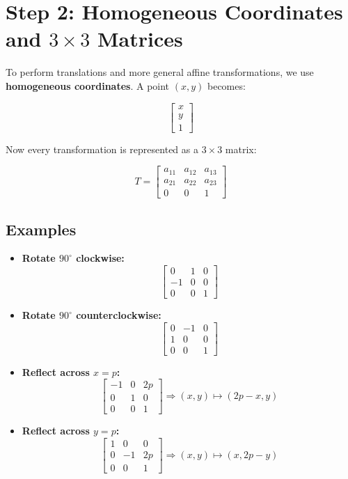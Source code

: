 \documentclass[12pt]{article}
\begin{document}
\section*{Step 2: Homogeneous Coordinates and $3 \times 3$ Matrices}
To perform translations and more general affine transformations, we use \textbf{homogeneous coordinates}. A point $(x, y)$ becomes:

\[
\begin{bmatrix}
x \\
y \\
1
\end{bmatrix}
\]

Now every transformation is represented as a $3 \times 3$ matrix:

\[
T =
\begin{bmatrix}
a_{11} & a_{12} & a_{13} \\
a_{21} & a_{22} & a_{23} \\
0 & 0 & 1
\end{bmatrix}
\]

\subsection*{Examples}
\begin{itemize}
    \item \textbf{Rotate $90^\circ$ clockwise:}
    \[
    \begin{bmatrix}
    0 & 1 & 0 \\
    -1 & 0 & 0 \\
    0 & 0 & 1
    \end{bmatrix}
    \]

    \item \textbf{Rotate $90^\circ$ counterclockwise:}
    \[
    \begin{bmatrix}
    0 & -1 & 0 \\
    1 & 0 & 0 \\
    0 & 0 & 1
    \end{bmatrix}
    \]

    \item \textbf{Reflect across $x = p$:}
    \[
    \begin{bmatrix}
    -1 & 0 & 2p \\
    0 & 1 & 0 \\
    0 & 0 & 1
    \end{bmatrix}
    \Rightarrow (x, y) \mapsto (2p - x, y)
    \]

    \item \textbf{Reflect across $y = p$:}
    \[
    \begin{bmatrix}
    1 & 0 & 0 \\
    0 & -1 & 2p \\
    0 & 0 & 1
    \end{bmatrix}
    \Rightarrow (x, y) \mapsto (x, 2p - y)
    \]
\end{itemize}
\end{document}
